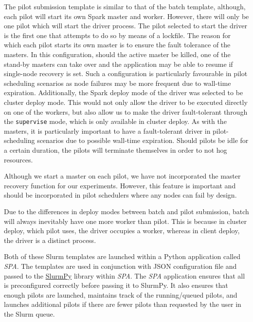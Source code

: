 	The pilot submission template is similar to that of the batch template,
	although, each pilot will start its own Spark master and worker.
	However, there will only be one pilot which will start the driver
	process. The pilot selected to start the driver is the first one that
	attempts to do so by means of a lockfile. The reason for which each
	pilot starts its own master is to ensure the fault tolerance of the
	masters. In this configuration, should the active master be killed, one
	of the stand-by masters can take over and the application may be able to
	resume if single-node recovery is set. Such a configuration is
	particularly favourable in pilot scheduling scenarios as node failures
	may be more frequent due to wall-time expiration. Additionally, the
	Spark deploy mode of the driver was selected to be cluster deploy mode.
	This would not only allow the driver to be executed directly on one of
	the workers, but also allow us to make the driver fault-tolerant through
	the \texttt{supervise} mode, which is only available in cluster deploy.
	As with the masters, it is particularly important to have a
	fault-tolerant driver in pilot-scheduling scenarios due to possible
	wall-time expiration. Should pilots be idle for a certain duration, the
	pilots will terminate themselves in order to not hog resources.
    
	Although we start a master on each pilot, we have not incorporated the
	master recovery function for our experiments. However, this feature is
	important and should be incorporated in pilot schedulers where any nodes
	can fail by design.
    
	Due to the differences in deploy modes between batch and pilot
	submission, batch will always inevitably have one more worker than
	pilot. This is because in cluster deploy, which pilot uses, the driver
	occupies a worker, whereas in client deploy, the driver is a distinct
	process.
    
	Both of these Slurm templates are launched within a Python application
	called \textit{SPA}. The templates are used in conjunction with JSON
	configuration file and passed to the
	\href{https://github.com/brentp/slurmpy}{SlurmPy} library within
	\textit{SPA}. The \textit{SPA} application ensures that all is
	preconfigured correctly before passing it to SlurmPy. It also ensures
	that enough pilots are launched, maintains track of the running/queued
	pilots, and launches additional pilots if there are fewer pilots than
	requested by the user in the Slurm queue.
    
